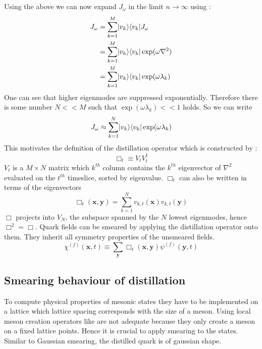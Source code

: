     \noindent
    Using the above we can now expand $J_\omega$ in the limit $n\rightarrow\infty$ using :
    \begin{equation}
        \begin{aligned}
            J_\omega &= \sum^M_{k=1}\lvert v_k\rangle\langle v_k\rvert J_\omega\\
            &= \sum^M_{k=1}\lvert v_k\rangle\langle v_k\rvert \exp(\omega\nabla^2)\\
            &= \sum^M_{k=1}\lvert v_k\rangle\langle v_k\rvert \exp(\omega\lambda_k)
        \end{aligned}
    \end{equation}
    One can see that higher eigenmodes are suppressed exponentially. Therefore there is some number $N<<M$ such that $\exp(\omega\lambda_k) << 1$ holds. So we can write
    \begin{equation}
        J_\omega \approx \sum^N_{k=1}\lvert v_k\rangle\langle v_k\rvert \exp(\omega\lambda_k)
    \end{equation}
    This motivates the definition of the distillation operator which is constructed by \cite{distillation_paper}:
    \begin{equation}
        \Box_t \equiv V_tV_t^\dagger
    \end{equation}
    $V_t$ is a $M \times N$ matrix which $k^{th}$ column contains the $k^{th}$ eigenvector of $\nabla^2$ evaluated on the $t^{th}$ timeslice, sorted by eigenvalue. $\Box_t$ can also be written in terms of the eigenvectors
    \begin{equation}\label{distillation_operator}
        \Box_{t}(\textbf{x},\textbf{y}) = \sum^N_{k=1}v_{k,t}(\textbf{x})v_{k,t}(\textbf{y})
    \end{equation}
    $\Box$ projects into $V_N$, the subspace spanned by the $N$ lowest eigenmodes, hence $\Box^2 = \Box$. Quark fields can be smeared by applying the distillation operator onto them. They inherit all symmetry properties of the unsmeared fields.
    \begin{equation}
        \chi^{(f)}(\textbf{x},t) \equiv \sum_{\textbf{y}} \Box_t(\textbf{x},\textbf{y}) \psi^{(f)}(\textbf{y},t)
    \end{equation}
    
\subsection{Smearing behaviour of distillation}
    To compute physical properties of mesonic states they have to be implemented on a lattice which lattice spacing corresponds with the size of a meson. Using local meson creation operators like  are not adequate because they only create a meson on a fixed lattice points. Hence it is crucial to apply smearing to the states. Similar to Gaussian smearing, the distilled quark is of gaussian shape.
    
